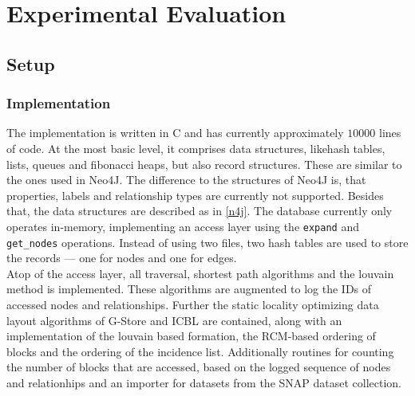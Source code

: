 \chapter{Experimental Evaluation}\label{\positionnumber} 
\section{Setup}\label{\positionnumber}
    \subsection*{Implementation}
        The implementation is written in C and has currently approximately $10 000$ lines of code.
        At the most basic level, it comprises data structures, likehash tables, lists, queues and fibonacci heaps, but also record structures. 
        These are similar to the ones used in Neo4J. 
        The difference to the structures of Neo4J is, that properties, labels and relationship types are currently not supported.
        Besides that, the data structures are described as in \ref{n4j}.
        The database currently only operates in-memory, implementing an access layer using the \texttt{expand} and \texttt{get_nodes} operations.
        Instead of using two files, two hash tables are used to store the records --- one for nodes and one for edges. \\
        Atop of the access layer, all traversal, shortest path algorithms and the louvain method is implemented. These algorithms are augmented to log the IDs of accessed nodes and relationships.
        Further the static locality optimizing data layout algorithms of G-Store and ICBL are contained, along with an implementation of the louvain based formation, the RCM-based ordering of blocks and the ordering of the incidence list.
        Additionally routines for counting the number of blocks that are accessed, based on the logged sequence of nodes and relationhips and an importer for datasets from the SNAP dataset collection.
    
    
